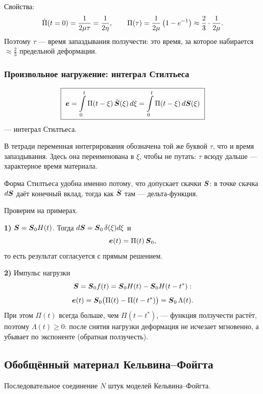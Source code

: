 
Свойства:
\[
  \dot{\Pi}(t=0) = \frac{1}{2\mu\tau} = \frac{1}{2\eta} ,
  \qquad
  \Pi(\tau) = \frac{1}{2\mu}\left(1 - e^{-1}\right) \approx \frac{2}{3}\cdot\frac{1}{2\mu} .
\]
Поэтому $\tau$ — время запаздывания ползучести: это время, за которое набирается
$\approx \tfrac23$ предельной деформации.

\subsubsection*{Произвольное нагружение: интеграл Стилтьеса}

\[
  \boxed{\ \boldsymbol{e} = \int\limits_0^t \Pi(t-\xi)\,\dot{\boldsymbol{S}}(\xi)\,d\xi
         = \int\limits_0^t \Pi(t-\xi)\,d\boldsymbol{S}(\xi)\ }
\]
— интеграл Стилтьеса.

\begin{idea}
В тетради переменная интегрирования обозначена той же буквой $\tau$, что и время
запаздывания. Здесь она переименована в $\xi$, чтобы не путать: $\tau$ всюду
дальше — характерное время материала.

Форма Стилтьеса удобна именно потому, что допускает скачки $\boldsymbol{S}$: в точке
скачка $d\boldsymbol{S}$ даёт конечный вклад, тогда как $\dot{\boldsymbol{S}}$ там — дельта-функция.
\end{idea}

Проверим на примерах.

\medskip
\textbf{1)} $\boldsymbol{S} = \boldsymbol{S}_0 H(t)$. Тогда $d\boldsymbol{S} = \boldsymbol{S}_0\,\delta(\xi)d\xi$ и
\[
  \boldsymbol{e}(t) = \Pi(t)\,\boldsymbol{S}_0 ,
\]
то есть результат согласуется с прямым решением.

\medskip
\textbf{2)} Импульс нагрузки
\[
  \boldsymbol{S} = \boldsymbol{S}_0 f(t) = \boldsymbol{S}_0 H(t) - \boldsymbol{S}_0 H(t - t^*) :
\]
\[
  \boldsymbol{e}(t) = \boldsymbol{S}_0\bigl(\Pi(t) - \Pi(t - t^*)\bigr) = \boldsymbol{S}_0\,\Lambda(t) .
\]
При этом $\Pi(t)$ всегда больше, чем $\Pi(t-t^*)$, — функция ползучести растёт,
поэтому $\Lambda(t) \ge 0$: после снятия нагрузки деформация не исчезает мгновенно,
а убывает по экспоненте (обратная ползучесть).


\subsection{Обобщённый материал Кельвина–Фойгта}

Последовательное соединение $N$ штук моделей Кельвина–Фойгта.


